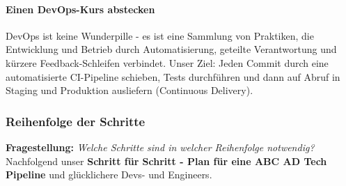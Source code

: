\paragraph{Einen DevOps-Kurs abstecken}
DevOps ist keine Wunderpille - es ist eine Sammlung von Praktiken, die Entwicklung und Betrieb durch Automatisierung,
geteilte Verantwortung und kürzere Feedback-Schleifen verbindet. Unser Ziel: Jeden Commit durch eine automatisierte CI-Pipeline schieben,
Tests durchführen und dann auf Abruf in Staging und Produktion ausliefern (Continuous Delivery).

\subsubsection{Reihenfolge der Schritte}

\textbf{Fragestellung:} \textit{Welche Schritte sind in welcher Reihenfolge notwendig?}
Nachfolgend unser \textbf{Schritt für Schritt - Plan für eine ABC AD Tech Pipeline} und glücklichere Devs- und Engineers. 

